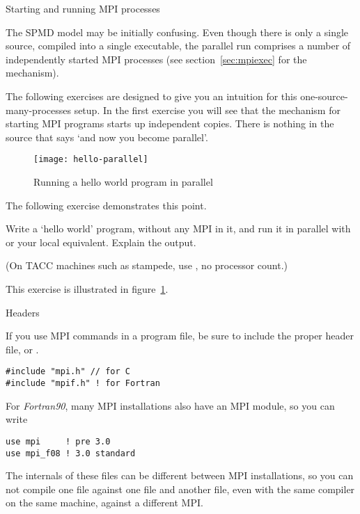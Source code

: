 
 {Starting and running MPI processes}
\label{sec:mpi-start}

The \ac{SPMD} model may be initially confusing. Even though there is
only a single source, compiled into a single executable,
the parallel run comprises a number of independently started MPI
processes (see section~\ref{sec:mpiexec} for the mechanism).

The following exercises are designed to give you an intuition for this
one-source-many-processes setup. In the first exercise you will see
that the mechanism for starting MPI programs starts up independent
copies. There is nothing in the source that says `and now you become parallel'.

\begin{figure}[ht]
  \texttt{[image: hello-parallel]}
  \caption{Running a hello world program in parallel}
  \label{fig:hello-parallel}
\end{figure}

The following exercise demonstrates this point.


\begin{exercise}
  \label{ex:hello1}
  Write a `hello world' program, without any MPI in it,
  and run it in parallel with  or your local equivalent. 
  Explain the output.

\begin{tacc}
    (On TACC machines such as stampede, use , no
    processor count.)
\end{tacc}

\end{exercise}

This exercise is illustrated in figure~\ref{fig:hello-parallel}.

 {Headers}

If you use MPI commands in a program file, be sure to include
the proper header file,  or .
\begin{verbatim}
#include "mpi.h" // for C
#include "mpif.h" ! for Fortran
\end{verbatim}
For \emph{Fortran90}, many MPI installations
also have an MPI module, so you can write
\begin{verbatim}
use mpi     ! pre 3.0
use mpi_f08 ! 3.0 standard
\end{verbatim}
The internals of these files can be different between MPI
installations, so you can not compile one file against one 
file and another file, even with the same compiler on the same machine,
against a different MPI.

